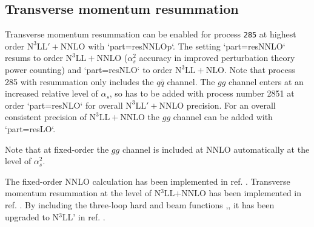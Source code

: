 \subsection{Transverse momentum resummation}

Transverse momentum resummation can be enabled for process {\tt 285} at
highest order $\text{N}^3\text{LL}'+\text{NNLO}$ with `part=resNNLOp`.
The setting `part=resNNLO` resums to order
$\text{N}^3\text{LL}+\text{NNLO}$ ($\alpha_s^2$ accuracy in improved
perturbation theory power counting) and `part=resNLO` to order
$\text{N}^3\text{LL}+\text{NLO}$. Note that process 285 with resummation
only includes the $q\bar{q}$ channel. The $gg$ channel enters at an
increased relative level of $\alpha_s$, so has to be added with process
number 2851 at order `part=resNLO` for overall
$\text{N}^3\text{LL}'+\text{NNLO}$ precision. For an overall consistent
precision of $\text{N}^3\text{LL}+\text{NNLO}$ the $gg$ channel can be
added with `part=resLO`.

Note that at fixed-order the $gg$ channel is included at NNLO
automatically at the level of $\alpha_s^2$.

The fixed-order NNLO calculation has been implemented in ref.
\cite{Campbell:2016yrh}. Transverse
momentum resummation at the level of N$^3$LL+NNLO
has been implemented in ref. \cite{Becher:2020ugp}. By including the three-loop hard
\cite{Caola:2020dfu} and beam functions
\cite{Luo:2020epw},\cite{Ebert:2020yqt},\cite{Luo:2019szz} it has been upgraded to N$^3$LL' in ref. \cite{Neumann:2021zkb}.

